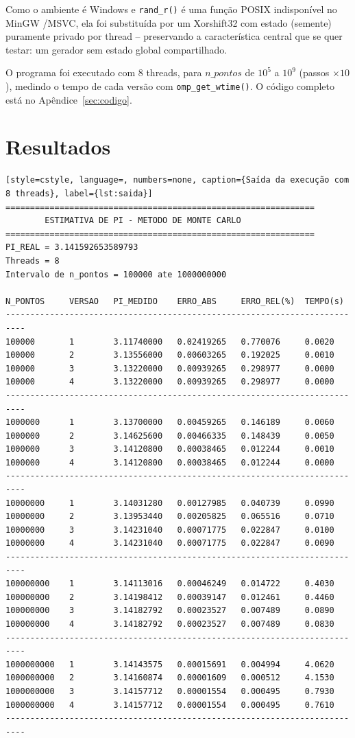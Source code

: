 \documentclass[a4paper,12pt]{article}
\begin{document}
Como o ambiente é Windows e \texttt{rand\_r()} é uma função POSIX indisponível no MinGW
/MSVC, ela foi
substituída por um Xorshift32 com estado (semente) puramente privado por thread -- preservando a
característica central que se quer testar: um gerador sem estado global compartilhado.

O programa foi executado com $8$ threads, para $n\_pontos$ de $10^5$ a $10^9$ (passos $\times 10$),
medindo o tempo de cada versão com \texttt{omp\_get\_wtime()}. O código completo está no
Apêndice~\ref{sec:codigo}.

\section{Resultados}

\begin{lstlisting}[style=cstyle, language=, numbers=none, caption={Saída da execução com 8 threads}, label={lst:saida}]
===============================================================
        ESTIMATIVA DE PI - METODO DE MONTE CARLO
===============================================================
PI_REAL = 3.141592653589793
Threads = 8
Intervalo de n_pontos = 100000 ate 1000000000

N_PONTOS     VERSAO   PI_MEDIDO    ERRO_ABS     ERRO_REL(%)  TEMPO(s)
--------------------------------------------------------------------------
100000       1        3.11740000   0.02419265   0.770076     0.0020
100000       2        3.13556000   0.00603265   0.192025     0.0010
100000       3        3.13220000   0.00939265   0.298977     0.0000
100000       4        3.13220000   0.00939265   0.298977     0.0000
--------------------------------------------------------------------------
1000000      1        3.13700000   0.00459265   0.146189     0.0060
1000000      2        3.14625600   0.00466335   0.148439     0.0050
1000000      3        3.14120800   0.00038465   0.012244     0.0010
1000000      4        3.14120800   0.00038465   0.012244     0.0000
--------------------------------------------------------------------------
10000000     1        3.14031280   0.00127985   0.040739     0.0990
10000000     2        3.13953440   0.00205825   0.065516     0.0710
10000000     3        3.14231040   0.00071775   0.022847     0.0100
10000000     4        3.14231040   0.00071775   0.022847     0.0090
--------------------------------------------------------------------------
100000000    1        3.14113016   0.00046249   0.014722     0.4030
100000000    2        3.14198412   0.00039147   0.012461     0.4460
100000000    3        3.14182792   0.00023527   0.007489     0.0890
100000000    4        3.14182792   0.00023527   0.007489     0.0830
--------------------------------------------------------------------------
1000000000   1        3.14143575   0.00015691   0.004994     4.0620
1000000000   2        3.14160874   0.00001609   0.000512     4.1530
1000000000   3        3.14157712   0.00001554   0.000495     0.7930
1000000000   4        3.14157712   0.00001554   0.000495     0.7610
--------------------------------------------------------------------------
\end{lstlisting}
\end{document}
